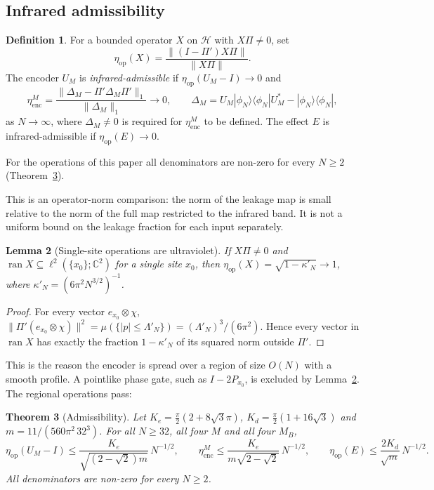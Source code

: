 \documentclass[11pt]{amsart}
\newtheorem{theorem}{Theorem}[section]
\newtheorem{lemma}[theorem]{Lemma}
\theoremstyle{definition}
\newtheorem{definition}[theorem]{Definition}
\theoremstyle{remark}
\newcommand{\C}{\mathbb{C}}
\begin{document}
\subsection{Infrared admissibility}
\begin{definition}\label{def:admissible}
For a bounded operator $X$ on $\mathcal H$ with $X\Pi\ne0$, set
\[
\eta_{\mathrm{op}}(X)=\frac{\|(I-\Pi')X\Pi\|}{\|X\Pi\|}.
\]
The encoder $U_M$ is \emph{infrared-admissible} if
$\eta_{\mathrm{op}}(U_M-I)\to0$ and
\[
\eta_{\mathrm{enc}}^M=\frac{\|\Delta_M-\Pi'\Delta_M\Pi'\|_1}{\|\Delta_M\|_1}\to0,
\qquad \Delta_M=U_M|\phi_N\rangle\langle\phi_N|U_M^*-|\phi_N\rangle\langle\phi_N|,
\]
as $N\to\infty$, where $\Delta_M\ne0$ is required for $\eta_{\mathrm{enc}}^M$
to be defined.  The effect $E$ is infrared-admissible if
$\eta_{\mathrm{op}}(E)\to0$.
\end{definition}

For the operations of this paper all denominators are non-zero for every
$N\ge2$ (Theorem~\ref{thm:admissible}).

This is an operator-norm comparison: the norm of the leakage map is small
relative to the norm of the full map restricted to the infrared band.
It is not a uniform bound on the leakage fraction for each input separately.

\begin{lemma}[Single-site operations are ultraviolet]\label{lem:point}
If $X\Pi\ne0$ and $\operatorname{ran}X\subseteq\ell^2(\{x_0\};\C^2)$ for a
single site $x_0$, then
$\eta_{\mathrm{op}}(X)=\sqrt{1-\kappa'_N}\to1$, where
$\kappa'_N=(6\pi^2N^{3/2})^{-1}$.
\end{lemma}

\begin{proof}
For every vector $e_{x_0}\otimes\chi$,
$\|\Pi'(e_{x_0}\otimes\chi)\|^2=\mu(\{|p|\le\Lambda'_N\})=(\Lambda'_N)^3/(6\pi^2)$.
Hence every vector in $\operatorname{ran}X$ has exactly the fraction
$1-\kappa'_N$ of its squared norm outside $\Pi'$.
\end{proof}

This is the reason the encoder is spread over a region of size $O(N)$ with
a smooth profile.  A pointlike phase gate, such as $I-2P_{x_0}$, is
excluded by Lemma~\ref{lem:point}.  The regional operations pass:

\begin{theorem}[Admissibility]\label{thm:admissible}
Let $K_e=\frac\pi2(2+8\sqrt3\pi)$, $K_d=\frac\pi2(1+16\sqrt3)$ and
$m=11/(560\pi^2\,32^3)$.  For all $N\ge32$, all four $M$ and all four
$M_B$,
\[
\eta_{\mathrm{op}}(U_M-I)\le\frac{K_e}{\sqrt{(2-\sqrt2)m}}\,N^{-1/2},\qquad
\eta_{\mathrm{enc}}^M\le\frac{K_e}{m\sqrt{2-\sqrt2}}\,N^{-1/2},\qquad
\eta_{\mathrm{op}}(E)\le\frac{2K_d}{\sqrt m}\,N^{-1/2}.
\]
All denominators are non-zero for every $N\ge2$.
\end{theorem}
\end{document}
